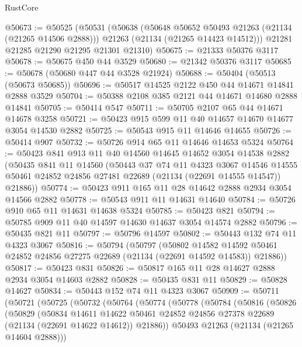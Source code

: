 \begin{lexlean}{RustCore}
\begin{coremodule}
@50673 := @50525
    (@50531
      (@50638
        (@50648 @50652 @50493 @21263 (@21134 (@21265 @14506 @2888)))
        @21263
        (@21134 (@21265 @14423 @14512)))
      @21281
      @21285
      @21290
      @21295
      @21301
      @21310)
@50675 := @21333 @50376 @3117
@50678 := @50675 @450 @44 @3529
@50680 := @21342 @50376 @3117
@50685 := @50678 (@50680 @447 @44 @3528 @21924)
@50688 := @50404 (@50513 (@50673 @50685))
@50696 := @50517 @14525 @2122 @450 @44 @14671 @14841 @2888 @3529
@50704 := @50388 @2108 @385 @2121 @44 @14671 @14680 @2888 @14841
@50705 := @50414 @547
@50711 := @50705 @2107 @65 @44 @14671 @14678 @3258
@50721 := @50423 @915 @599 @11 @40 @14657 @14670 @14677 @3054 @14530 @2882
@50725 := @50543 @915 @11 @14646 @14655
@50726 := @50414 @907
@50732 := @50726 @914 @65 @11 @14646 @14653 @5324
@50764 := @50423
    @841
    @913
    @11
    @40
    @14560
    @14645
    @14652
    @3054
    @14538
    @2882
    (@50435
      @841
      @11
      @14560
      (@50443
        @37
        @74
        @11
        @4323
        @3067
        @14546
        @14555
        @50461
        @24852
        @24856
        @27481
        @22689
        (@21134 (@22691 @14555 @14547))
        @21886))
@50774 := @50423 @911 @165 @11 @28 @14642 @2888 @2934 @3054 @14566 @2882
@50778 := @50543 @911 @11 @14631 @14640
@50784 := @50726 @910 @65 @11 @14631 @14638 @5324
@50785 := @50423 @821
@50794 := @50785 @909 @11 @40 @14597 @14630 @14637 @3054 @14574 @2882
@50796 := @50435 @821 @11
@50797 := @50796 @14597
@50802 := @50443 @132 @74 @11 @4323 @3067
@50816 := @50794
    (@50797
      (@50802
        @14582
        @14592
        @50461
        @24852
        @24856
        @27275
        @22689
        (@21134 (@22691 @14592 @14583))
        @21886))
@50817 := @50423 @831
@50826 := @50817 @165 @11 @28 @14627 @2888 @2934 @3054 @14603 @2882
@50828 := @50435 @831 @11
@50829 := @50828 @14627
@50834 := @50443 @152 @74 @11 @4323 @3067
@50909 := @50711
    (@50721
      (@50725
        (@50732
          (@50764
            (@50774
              (@50778
                (@50784
                  (@50816
                    (@50826
                      (@50829
                        (@50834
                          @14611
                          @14622
                          @50461
                          @24852
                          @24856
                          @27378
                          @22689
                          (@21134 (@22691 @14622 @14612))
                          @21886))
                      @50493
                      @21263
                      (@21134 (@21265 @14604 @2888)))

\end{coremodule}
\end{lexlean}
